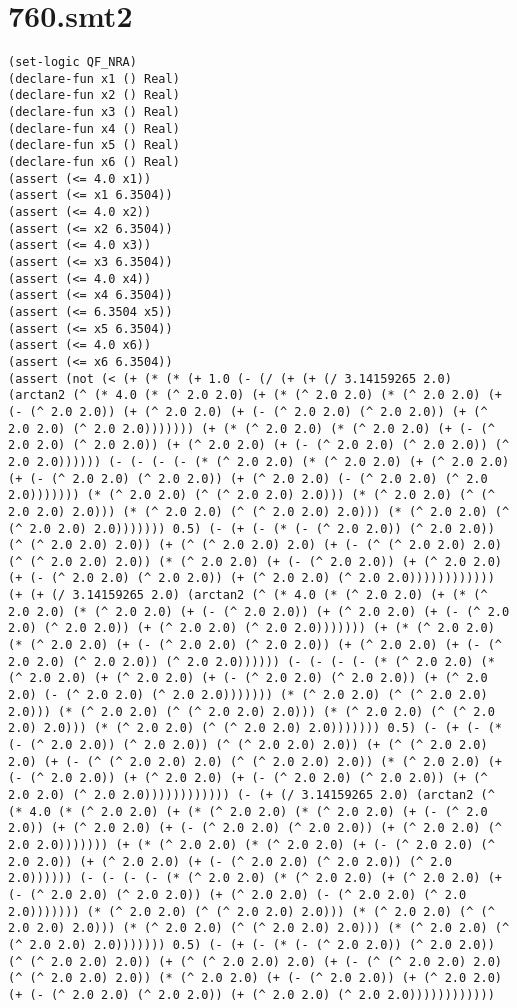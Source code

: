 \appendix
\section{760.smt2}
\begin{lstlisting}
(set-logic QF_NRA)
(declare-fun x1 () Real)
(declare-fun x2 () Real)
(declare-fun x3 () Real)
(declare-fun x4 () Real)
(declare-fun x5 () Real)
(declare-fun x6 () Real)
(assert (<= 4.0 x1))
(assert (<= x1 6.3504))
(assert (<= 4.0 x2))
(assert (<= x2 6.3504))
(assert (<= 4.0 x3))
(assert (<= x3 6.3504))
(assert (<= 4.0 x4))
(assert (<= x4 6.3504))
(assert (<= 6.3504 x5))
(assert (<= x5 6.3504))
(assert (<= 4.0 x6))
(assert (<= x6 6.3504))
(assert (not (< (+ (* (* (+ 1.0 (- (/ (+ (+ (/ 3.14159265 2.0) (arctan2 (^ (* 4.0 (* (^ 2.0 2.0) (+ (* (^ 2.0 2.0) (* (^ 2.0 2.0) (+ (- (^ 2.0 2.0)) (+ (^ 2.0 2.0) (+ (- (^ 2.0 2.0) (^ 2.0 2.0)) (+ (^ 2.0 2.0) (^ 2.0 2.0))))))) (+ (* (^ 2.0 2.0) (* (^ 2.0 2.0) (+ (- (^ 2.0 2.0) (^ 2.0 2.0)) (+ (^ 2.0 2.0) (+ (- (^ 2.0 2.0) (^ 2.0 2.0)) (^ 2.0 2.0)))))) (- (- (- (- (* (^ 2.0 2.0) (* (^ 2.0 2.0) (+ (^ 2.0 2.0) (+ (- (^ 2.0 2.0) (^ 2.0 2.0)) (+ (^ 2.0 2.0) (- (^ 2.0 2.0) (^ 2.0 2.0))))))) (* (^ 2.0 2.0) (^ (^ 2.0 2.0) 2.0))) (* (^ 2.0 2.0) (^ (^ 2.0 2.0) 2.0))) (* (^ 2.0 2.0) (^ (^ 2.0 2.0) 2.0))) (* (^ 2.0 2.0) (^ (^ 2.0 2.0) 2.0))))))) 0.5) (- (+ (- (* (- (^ 2.0 2.0)) (^ 2.0 2.0)) (^ (^ 2.0 2.0) 2.0)) (+ (^ (^ 2.0 2.0) 2.0) (+ (- (^ (^ 2.0 2.0) 2.0) (^ (^ 2.0 2.0) 2.0)) (* (^ 2.0 2.0) (+ (- (^ 2.0 2.0)) (+ (^ 2.0 2.0) (+ (- (^ 2.0 2.0) (^ 2.0 2.0)) (+ (^ 2.0 2.0) (^ 2.0 2.0)))))))))))) (+ (+ (/ 3.14159265 2.0) (arctan2 (^ (* 4.0 (* (^ 2.0 2.0) (+ (* (^ 2.0 2.0) (* (^ 2.0 2.0) (+ (- (^ 2.0 2.0)) (+ (^ 2.0 2.0) (+ (- (^ 2.0 2.0) (^ 2.0 2.0)) (+ (^ 2.0 2.0) (^ 2.0 2.0))))))) (+ (* (^ 2.0 2.0) (* (^ 2.0 2.0) (+ (- (^ 2.0 2.0) (^ 2.0 2.0)) (+ (^ 2.0 2.0) (+ (- (^ 2.0 2.0) (^ 2.0 2.0)) (^ 2.0 2.0)))))) (- (- (- (- (* (^ 2.0 2.0) (* (^ 2.0 2.0) (+ (^ 2.0 2.0) (+ (- (^ 2.0 2.0) (^ 2.0 2.0)) (+ (^ 2.0 2.0) (- (^ 2.0 2.0) (^ 2.0 2.0))))))) (* (^ 2.0 2.0) (^ (^ 2.0 2.0) 2.0))) (* (^ 2.0 2.0) (^ (^ 2.0 2.0) 2.0))) (* (^ 2.0 2.0) (^ (^ 2.0 2.0) 2.0))) (* (^ 2.0 2.0) (^ (^ 2.0 2.0) 2.0))))))) 0.5) (- (+ (- (* (- (^ 2.0 2.0)) (^ 2.0 2.0)) (^ (^ 2.0 2.0) 2.0)) (+ (^ (^ 2.0 2.0) 2.0) (+ (- (^ (^ 2.0 2.0) 2.0) (^ (^ 2.0 2.0) 2.0)) (* (^ 2.0 2.0) (+ (- (^ 2.0 2.0)) (+ (^ 2.0 2.0) (+ (- (^ 2.0 2.0) (^ 2.0 2.0)) (+ (^ 2.0 2.0) (^ 2.0 2.0)))))))))))) (- (+ (/ 3.14159265 2.0) (arctan2 (^ (* 4.0 (* (^ 2.0 2.0) (+ (* (^ 2.0 2.0) (* (^ 2.0 2.0) (+ (- (^ 2.0 2.0)) (+ (^ 2.0 2.0) (+ (- (^ 2.0 2.0) (^ 2.0 2.0)) (+ (^ 2.0 2.0) (^ 2.0 2.0))))))) (+ (* (^ 2.0 2.0) (* (^ 2.0 2.0) (+ (- (^ 2.0 2.0) (^ 2.0 2.0)) (+ (^ 2.0 2.0) (+ (- (^ 2.0 2.0) (^ 2.0 2.0)) (^ 2.0 2.0)))))) (- (- (- (- (* (^ 2.0 2.0) (* (^ 2.0 2.0) (+ (^ 2.0 2.0) (+ (- (^ 2.0 2.0) (^ 2.0 2.0)) (+ (^ 2.0 2.0) (- (^ 2.0 2.0) (^ 2.0 2.0))))))) (* (^ 2.0 2.0) (^ (^ 2.0 2.0) 2.0))) (* (^ 2.0 2.0) (^ (^ 2.0 2.0) 2.0))) (* (^ 2.0 2.0) (^ (^ 2.0 2.0) 2.0))) (* (^ 2.0 2.0) (^ (^ 2.0 2.0) 2.0))))))) 0.5) (- (+ (- (* (- (^ 2.0 2.0)) (^ 2.0 2.0)) (^ (^ 2.0 2.0) 2.0)) (+ (^ (^ 2.0 2.0) 2.0) (+ (- (^ (^ 2.0 2.0) 2.0) (^ (^ 2.0 2.0) 2.0)) (* (^ 2.0 2.0) (+ (- (^ 2.0 2.0)) (+ (^ 2.0 2.0) (+ (- (^ 2.0 2.0) (^ 2.0 2.0)) (+ (^ 2.0 2.0) (^ 2.0 2.0)))))))))))) 
\end{lstlisting}
